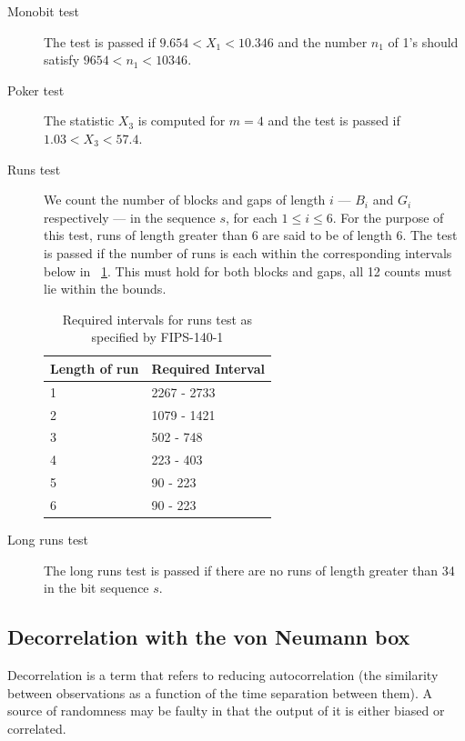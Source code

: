 \documentclass[a4paper]{article}           %
\begin{document}
\begin{description}
\item[Monobit test] The test is passed if $9.654 < X_1 < 10.346$ and the number $n_1$ of 1's should satisfy $9654 < n_1 < 10346$.
\item[Poker test] The statistic $X_3$ is computed for $m=4$ and the test is passed if $1.03 < X_3 < 57.4$. 
\item [Runs test] We count the number of blocks and gaps of length $i$ --- $B_i$ and $G_i$ respectively --- in the sequence $s$, for each $1 \leq i \leq 6$. For the purpose of this test, runs of length greater than 6 are said to be of length 6\cite{fips140}. The test is passed if the number of runs is each within the corresponding intervals below in ~\ref{tab:fipsbounds}. This must hold for both blocks and gaps, all 12 counts must lie within the bounds. 

  \begin{table}[H]
    \begin{center}
      \begin{tabular}{| l | l |}
        \hline
        Length of run & Required Interval \\
        \hline
        \hline
        1 & 2267 - 2733 \\
        2 & 1079 - 1421 \\
        3 & 502 - 748 \\
        4 & 223 - 403 \\
        5 & 90 - 223 \\
        6 & 90 - 223 \\
        \hline
      \end{tabular}
    \end{center}
    \caption{Required intervals for runs test as specified by FIPS-140-1}
    \label{tab:fipsbounds}
  \end{table}

\item[Long runs test] The long runs test is passed if there are no runs of length greater than 34 in the bit sequence $s$. 
\end{description}

\subsection{Decorrelation with the von Neumann box}

Decorrelation is a term that refers to reducing autocorrelation (the similarity between observations as a function of the time separation between them). A source of randomness may be faulty in that the output of it is either biased or correlated. 
\end{document}
